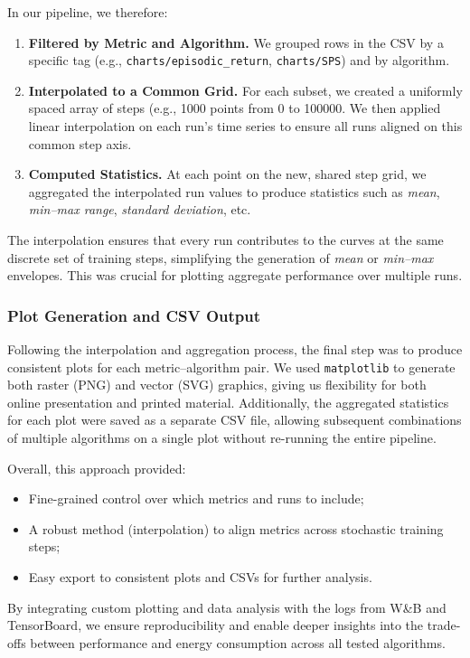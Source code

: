 In our pipeline, we therefore:
\begin{enumerate}
	\item \textbf{Filtered by Metric and Algorithm.} We grouped rows in the CSV by a specific tag (e.g., \texttt{charts/episodic\_return}, \texttt{charts/SPS}) and by algorithm.
	\item \textbf{Interpolated to a Common Grid.} For each subset, we created a uniformly spaced array of steps (e.g., \num{1000} points from \num{0} to \num{100000}. We then applied linear interpolation on each run's time series to ensure all runs aligned on this common step axis.
	\item \textbf{Computed Statistics.} At each point on the new, shared step grid, we aggregated the interpolated run values to produce statistics such as \textit{mean}, \textit{min--max range}, \textit{standard deviation}, etc.
\end{enumerate}
The interpolation ensures that every run contributes to the curves at the same discrete set of training steps, simplifying the generation of \emph{mean} or \emph{min--max} envelopes. This was crucial for plotting aggregate performance over multiple runs.

\subsubsection{Plot Generation and CSV Output}
Following the interpolation and aggregation process, the final step was to produce consistent plots for each metric--algorithm pair. We used \texttt{matplotlib} to generate both raster (PNG) and vector (SVG) graphics, giving us flexibility for both online presentation and printed material. Additionally, the aggregated statistics for each plot were saved as a separate CSV file, allowing subsequent combinations of multiple algorithms on a single plot without re-running the entire pipeline.

Overall, this approach provided:
\begin{itemize}
	\item Fine-grained control over which metrics and runs to include;
	\item A robust method (interpolation) to align metrics across stochastic training steps;
	\item Easy export to consistent plots and CSVs for further analysis.
\end{itemize}
By integrating custom plotting and data analysis with the logs from W\&B and TensorBoard, we ensure reproducibility and enable deeper insights into the trade-offs between performance and energy consumption across all tested algorithms.

